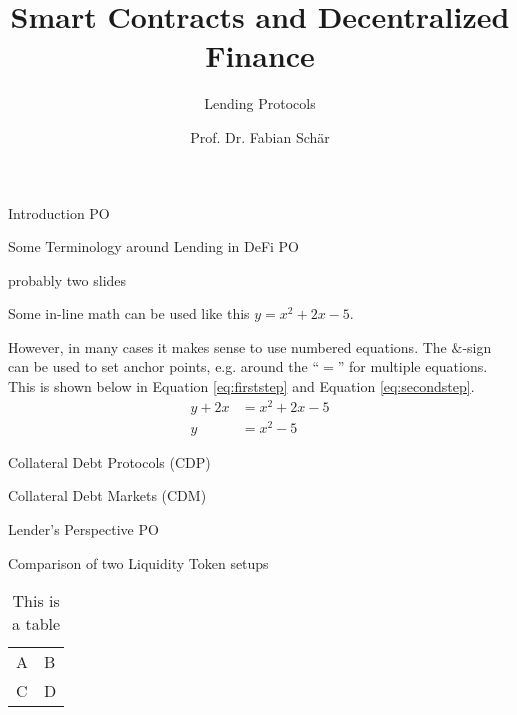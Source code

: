 \documentclass[]{beamer}
\title{Smart Contracts and Decentralized Finance}
\subtitle{Lending Protocols}
\author{Prof. Dr. Fabian Schär}
\institute{University of Basel}
\begin{document}
\thispagestyle{empty}
\begin{frame}[noframenumbering]
	\titlepage
\end{frame}

\begin{frame}{Introduction PO}

	
\end{frame}


\begin{frame}{Some Terminology around Lending in DeFi PO}

probably two slides

Some in-line math can be used like this $y=x^2+2x-5$. \\ \vspace{1em}

However, in many cases it makes sense to use numbered equations. The $\&$-sign can be used to set anchor points, e.g. around the ``$=$'' for multiple equations. This is shown below in Equation \eqref{eq:firststep} and Equation \eqref{eq:secondstep}.
	\begin{align}
		y + 2x &= x^2+2x-5 \label{eq:firststep}\\
		y &= x^2-5 \label{eq:secondstep}
	\end{align}
	
\end{frame}


\begin{frame}{Collateral Debt Protocols (CDP)}

	
\end{frame}


\begin{frame}{Collateral Debt Markets (CDM)}

	
\end{frame}


\begin{frame}{Lender's Perspective PO}

	
\end{frame}


\begin{frame}{Comparison of two Liquidity Token setups}

	\begin{table}
		\begin{tabular}{ll}
			A & B\\
			C & D
		\end{tabular}
		\caption{This is a table}
		\label{tbl:simpletable}
	\end{table}
	
\end{frame}
\end{document}
